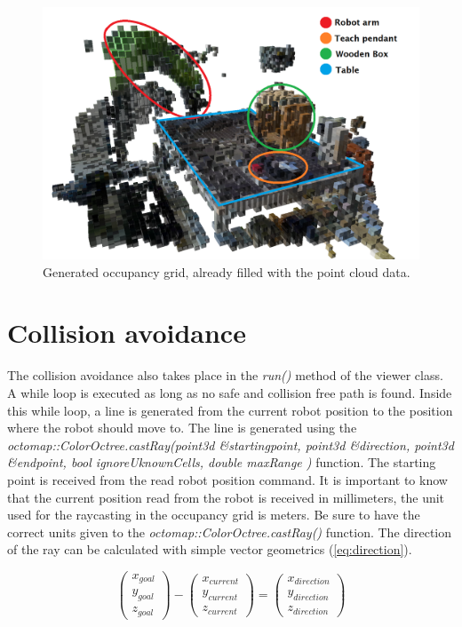\begin{figure}[H]                                      
	\centering\includegraphics[scale=0.45]{images/occupancy_grid_marked.png}			
	\caption{Generated occupancy grid, already filled with the point cloud data.}
	\label{fig:occupamcy}                      
\end{figure}


\section{Collision avoidance}
\label{sec:avoid}

The collision avoidance also takes place in the \emph{run()} method of the viewer class. A while loop is executed as long as no safe and collision free path is found. Inside this while loop, a line is generated from the current robot position to the position where the robot should move to. The line is generated using the \emph{octomap::ColorOctree.castRay(point3d \&startingpoint, point3d \&direction, point3d \&endpoint, bool ignoreUknownCells, double maxRange )} function.
The starting point is received from the read robot position command. It is important to know that the current position read from the robot is received in millimeters, the unit used for the raycasting in the occupancy grid is meters. Be sure to have the correct units given to the \emph{octomap::ColorOctree.castRay()} function. The direction of the ray can be calculated with simple vector geometrics (\ref{eq:direction}).

\begin{equation}
\label{eq:direction}
	\begin{pmatrix}
	x_{goal}\\
	y_{goal}\\
	z_{goal}
	\end{pmatrix}
	-
	\begin{pmatrix}
	x_{current}\\
	y_{current}\\
	z_{current}
	\end{pmatrix}
	=
		\begin{pmatrix}
	x_{direction}\\
	y_{direction}\\
	z_{direction}
	\end{pmatrix}
\end{equation}

